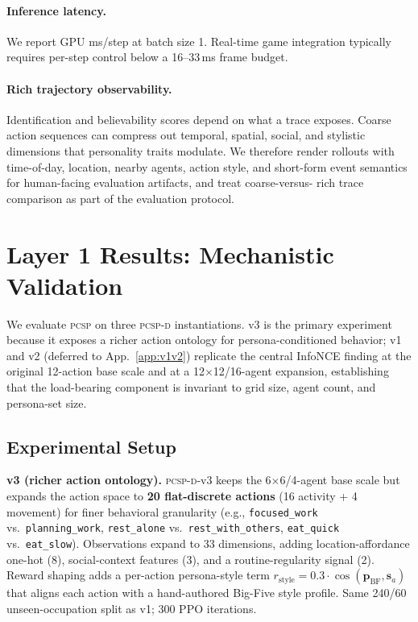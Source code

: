 \documentclass[conference]{IEEEtran}
\newcommand{\PCSP}{\textsc{pcsp}\xspace}
\newcommand{\PCSPD}{\textsc{pcsp-d}\xspace}
\begin{document}
\paragraph{Inference latency.}
We report GPU ms/step at batch size 1. Real-time game integration typically
requires per-step control below a 16--33\,ms frame budget.

\paragraph{Rich trajectory observability.}
Identification and believability scores depend on what a trace exposes.
Coarse action sequences can compress out temporal, spatial, social, and
stylistic dimensions that personality traits modulate. We therefore render
rollouts with time-of-day, location, nearby agents, action style, and short-form
event semantics for human-facing evaluation artifacts, and treat coarse-versus-
rich trace comparison as part of the evaluation protocol.

\section{Layer 1 Results: Mechanistic Validation}
\label{sec:evidence}

We evaluate \PCSP on three \PCSPD{} instantiations. v3 is the primary
experiment because it exposes a richer action ontology for
persona-conditioned behavior; v1 and v2 (deferred to App.~\ref{app:v1v2})
replicate the central InfoNCE finding at the original 12-action base scale
and at a 12$\times$12/16-agent expansion, establishing that the load-bearing
component is invariant to grid size, agent count, and persona-set size.

\subsection{Experimental Setup}

\textbf{v3 (richer action ontology).}
\PCSPD-v3 keeps the 6$\times$6/4-agent base scale but expands the action
space to \textbf{20 flat-discrete actions} (16 activity + 4 movement) for
finer behavioral granularity (e.g., \texttt{focused\_work} vs.\
\texttt{planning\_work}, \texttt{rest\_alone} vs.\ \texttt{rest\_with\_others},
\texttt{eat\_quick} vs.\ \texttt{eat\_slow}).
Observations expand to 33 dimensions, adding location-affordance one-hot
(8), social-context features (3), and a routine-regularity signal (2).
Reward shaping adds a per-action persona-style term
$r_{\text{style}} = 0.3 \cdot \cos(\mathbf{p}_{\text{BF}}, \mathbf{s}_a)$
that aligns each action with a hand-authored Big-Five style profile.
Same 240/60 unseen-occupation split as v1; 300 PPO iterations.
\end{document}
